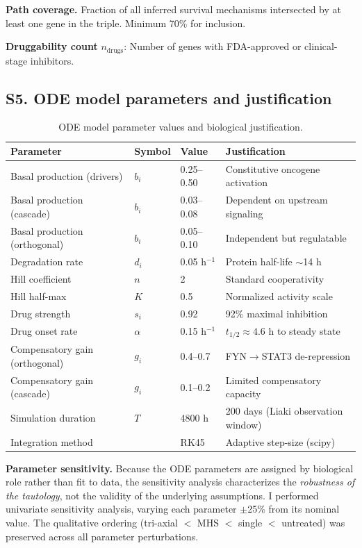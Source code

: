 \documentclass[11pt]{article}
\begin{document}
\textbf{Path coverage.} Fraction of all inferred survival mechanisms intersected by at least one gene in the triple. Minimum 70\% for inclusion.

\textbf{Druggability count} $n_{\text{drugs}}$: Number of genes with FDA-approved or clinical-stage inhibitors.

\subsection{S5. ODE model parameters and justification}

\begin{table}[htbp]
\centering
\small
\caption{ODE model parameter values and biological justification.}
\begin{tabular}{@{}llll@{}}
\toprule
\textbf{Parameter} & \textbf{Symbol} & \textbf{Value} & \textbf{Justification} \\
\midrule
Basal production (drivers) & $b_i$ & 0.25--0.50 & Constitutive oncogene activation \\
Basal production (cascade) & $b_i$ & 0.03--0.08 & Dependent on upstream signaling \\
Basal production (orthogonal) & $b_i$ & 0.05--0.10 & Independent but regulatable \\
Degradation rate & $d_i$ & 0.05 h$^{-1}$ & Protein half-life $\sim$14 h \\
Hill coefficient & $n$ & 2 & Standard cooperativity \\
Hill half-max & $K$ & 0.5 & Normalized activity scale \\
Drug strength & $s_i$ & 0.92 & 92\% maximal inhibition \\
Drug onset rate & $\alpha$ & 0.15 h$^{-1}$ & $t_{1/2} \approx 4.6$ h to steady state \\
Compensatory gain (orthogonal) & $g_i$ & 0.4--0.7 & FYN$\to$STAT3 de-repression \\
Compensatory gain (cascade) & $g_i$ & 0.1--0.2 & Limited compensatory capacity \\
Simulation duration & $T$ & 4800 h & 200 days (Liaki observation window) \\
Integration method & & RK45 & Adaptive step-size (scipy) \\
\bottomrule
\end{tabular}
\end{table}

\textbf{Parameter sensitivity.} Because the ODE parameters are assigned by biological role rather than fit to data, the sensitivity analysis characterizes the \emph{robustness of the tautology}, not the validity of the underlying assumptions. I performed univariate sensitivity analysis, varying each parameter $\pm$25\% from its nominal value. The qualitative ordering (tri-axial $<$ MHS $<$ single $<$ untreated) was preserved across all parameter perturbations.
\end{document}
